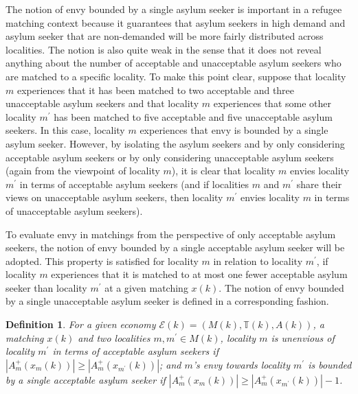 \documentclass[12pt,fleqn]{article}
\newtheorem{definition}{Definition}
\begin{document}
\noindent The notion of envy bounded by a single asylum seeker is important in a refugee matching context because it guarantees that asylum seekers in high demand and asylum seeker that are non-demanded will be more fairly distributed across localities. The notion is also quite weak in the sense that it does not reveal anything about the number of acceptable and unacceptable asylum seekers who are matched to a specific locality. To make this point clear, suppose that locality $m$ experiences that it has been matched to two acceptable and three unacceptable asylum seekers and that locality $m$ experiences that some other locality $m^\prime$ has been matched to five acceptable and five unacceptable asylum seekers. In this case, locality $m$ experiences that envy is bounded by a single asylum seeker. However, by isolating the asylum seekers and by only considering acceptable asylum seekers or by only considering unacceptable asylum seekers (again from the viewpoint of locality $m$), it is clear that locality $m$ envies locality $m^\prime$ in terms of acceptable asylum seekers (and if localities $m$ and $m^\prime$ share their views on unacceptable asylum seekers, then locality $m^\prime$ envies locality $m$ in terms of unacceptable asylum seekers).

To evaluate envy in matchings from the perspective of only acceptable asylum seekers, the notion of envy bounded by a single acceptable asylum seeker will be adopted. This property is satisfied for locality $m$ in relation to locality $m^\prime$, if locality $m$ experiences that it is matched to at most one fewer acceptable asylum seeker than locality $m^\prime$ at a given matching $x(k)$. The notion of envy bounded by a single unacceptable asylum seeker is defined in a corresponding fashion.

\begin{definition}\rm\label{DEF:1-Envy_ACC}
For a given economy $\mathcal{E}(k)=(M(k),\mathbb{T}(k),A(k))$, a matching $x(k)$ and two localities $m,m^\prime\in M(k)$, locality $m$ is unenvious of locality $m^\prime$ in terms of acceptable asylum seekers if $|A_m^+(x_m(k))|\geq |A_m^+(x_{m^\prime}(k))|$; and $m$'s envy towards locality $m^\prime$ is bounded by a single acceptable asylum seeker if $|A_m^+(x_m(k))|\geq |A_m^+(x_{m^\prime}(k))|-1$.
\end{definition}
\end{document}
